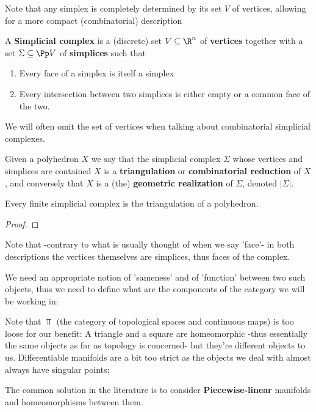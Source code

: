 Note that any simplex is completely determined by its set $V$ of vertices, allowing for a more compact (combinatorial) description
\begin{definition}\hfill

    A \textbf{Simplicial complex} is a (discrete) set $V\subseteq \R^n$ of \textbf{vertices} together with a set $\Sigma\subseteq \Pp V$ of \textbf{simplices}
    such that 
    \begin{enumerate}
        \item Every face of a simplex is itself a simplex
        \item Every intersection between two simplices is either empty or a common face of the two.
    \end{enumerate}
    We will often omit the set of vertices when talking about combinatorial simplicial complexes.
    
    Given a polyhedron $X$ we say that the simplicial complex $\Sigma$ whose vertices and simplices are contained $X$ is a 
    \textbf{triangulation} or \textbf{combinatorial reduction} of $X$, and conversely that $X$ is a (the) \textbf{geometric realization} of $\Sigma$, denoted $|\Sigma|$.
\end{definition}
\begin{lemma}\hfill 

    Every finite simplicial complex is the triangulation of a polyhedron.
\end{lemma}
\begin{proof}
\end{proof}

Note that -contrary to what is usually thought of when we say 'face'- in both descriptions the vertices themselves are simplices, thus faces of the complex.

We need an appropriate notion of 'sameness' and of 'function' between two such objects,
thus we need to define what are the components of the category we will be working in:

Note that $\Top$ (the category of topological spaces and continuous maps) is too loose for our benefit:
A triangle and a square are homeomorphic -thus essentially the same objects as far as topology is concerned-
but they're different objects to us. Differentiable manifolds are a bit too strict as the objects we deal with almost always have singular points;

The common solution in the literature is to consider \textbf{Piecewise-linear} manifolds and homeomorphisms between them.

